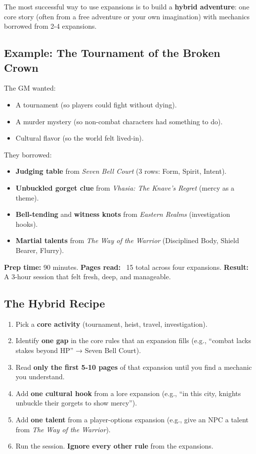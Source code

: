 The most successful way to use expansions is to build a \textbf{hybrid adventure}: one core story (often from a free adventure or your own imagination) with mechanics borrowed from 2-4 expansions.

\subsection{Example: The Tournament of the Broken Crown}

The GM wanted:
\begin{itemize}
\item A tournament (so players could fight without dying).
\item A murder mystery (so non-combat characters had something to do).
\item Cultural flavor (so the world felt lived-in).
\end{itemize}

They borrowed:
\begin{itemize}
\item \textbf{Judging table} from \textit{Seven Bell Court} (3 rows: Form, Spirit, Intent).
\item \textbf{Unbuckled gorget clue} from \textit{Vhasia: The Knave's Regret} (mercy as a theme).
\item \textbf{Bell-tending} and \textbf{witness knots} from \textit{Eastern Realms} (investigation hooks).
\item \textbf{Martial talents} from \textit{The Way of the Warrior} (Disciplined Body, Shield Bearer, Flurry).
\end{itemize}

\textbf{Prep time:} 90 minutes. \textbf{Pages read:} ~15 total across four expansions. \textbf{Result:} A 3-hour session that felt fresh, deep, and manageable.

\subsection{The Hybrid Recipe}

\begin{enumerate}
\item Pick a \textbf{core activity} (tournament, heist, travel, investigation).
\item Identify \textbf{one gap} in the core rules that an expansion fills (e.g., “combat lacks stakes beyond HP” → Seven Bell Court).
\item Read \textbf{only the first 5-10 pages} of that expansion until you find a mechanic you understand.
\item Add \textbf{one cultural hook} from a lore expansion (e.g., “in this city, knights unbuckle their gorgets to show mercy”).
\item Add \textbf{one talent} from a player-options expansion (e.g., give an NPC a talent from \textit{The Way of the Warrior}).
\item Run the session. \textbf{Ignore every other rule} from the expansions.
\end{enumerate}


